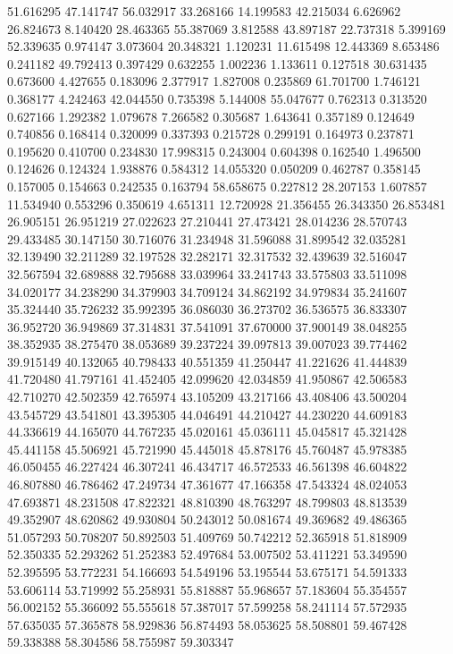 51.616295
47.141747
56.032917
33.268166
14.199583
42.215034
6.626962
26.824673
8.140420
28.463365
55.387069
3.812588
43.897187
22.737318
5.399169
52.339635
0.974147
3.073604
20.348321
1.120231
11.615498
12.443369
8.653486
0.241182
49.792413
0.397429
0.632255
1.002236
1.133611
0.127518
30.631435
0.673600
4.427655
0.183096
2.377917
1.827008
0.235869
61.701700
1.746121
0.368177
4.242463
42.044550
0.735398
5.144008
55.047677
0.762313
0.313520
0.627166
1.292382
1.079678
7.266582
0.305687
1.643641
0.357189
0.124649
0.740856
0.168414
0.320099
0.337393
0.215728
0.299191
0.164973
0.237871
0.195620
0.410700
0.234830
17.998315
0.243004
0.604398
0.162540
1.496500
0.124626
0.124324
1.938876
0.584312
14.055320
0.050209
0.462787
0.358145
0.157005
0.154663
0.242535
0.163794
58.658675
0.227812
28.207153
1.607857
11.534940
0.553296
0.350619
4.651311
12.720928
21.356455
26.343350
26.853481
26.905151
26.951219
27.022623
27.210441
27.473421
28.014236
28.570743
29.433485
30.147150
30.716076
31.234948
31.596088
31.899542
32.035281
32.139490
32.211289
32.197528
32.282171
32.317532
32.439639
32.516047
32.567594
32.689888
32.795688
33.039964
33.241743
33.575803
33.511098
34.020177
34.238290
34.379903
34.709124
34.862192
34.979834
35.241607
35.324440
35.726232
35.992395
36.086030
36.273702
36.536575
36.833307
36.952720
36.949869
37.314831
37.541091
37.670000
37.900149
38.048255
38.352935
38.275470
38.053689
39.237224
39.097813
39.007023
39.774462
39.915149
40.132065
40.798433
40.551359
41.250447
41.221626
41.444839
41.720480
41.797161
41.452405
42.099620
42.034859
41.950867
42.506583
42.710270
42.502359
42.765974
43.105209
43.217166
43.408406
43.500204
43.545729
43.541801
43.395305
44.046491
44.210427
44.230220
44.609183
44.336619
44.165070
44.767235
45.020161
45.036111
45.045817
45.321428
45.441158
45.506921
45.721990
45.445018
45.878176
45.760487
45.978385
46.050455
46.227424
46.307241
46.434717
46.572533
46.561398
46.604822
46.807880
46.786462
47.249734
47.361677
47.166358
47.543324
48.024053
47.693871
48.231508
47.822321
48.810390
48.763297
48.799803
48.813539
49.352907
48.620862
49.930804
50.243012
50.081674
49.369682
49.486365
51.057293
50.708207
50.892503
51.409769
50.742212
52.365918
51.818909
52.350335
52.293262
51.252383
52.497684
53.007502
53.411221
53.349590
52.395595
53.772231
54.166693
54.549196
53.195544
53.675171
54.591333
53.606114
53.719992
55.258931
55.818887
55.968657
57.183604
55.354557
56.002152
55.366092
55.555618
57.387017
57.599258
58.241114
57.572935
57.635035
57.365878
58.929836
56.874493
58.053625
58.508801
59.467428
59.338388
58.304586
58.755987
59.303347
